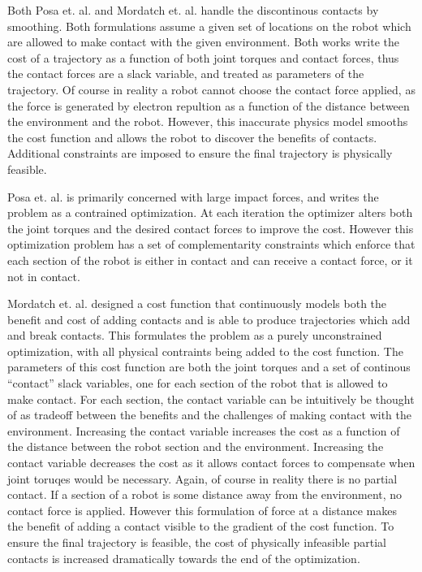 \documentclass[../thesis.tex]{subfiles}
\begin{document}
Both Posa et. al. \cite{Posa2013} and Mordatch et. al. \cite{Mordatch2012}  handle the discontinous contacts by smoothing.
Both formulations assume a given set of locations on the robot which are allowed to make contact with the given environment.
Both works write the cost of a trajectory as a function of both joint torques and contact forces, thus the contact forces are a slack variable, and treated as parameters of the trajectory.
Of course in reality a robot cannot choose the contact force applied, as the force is generated by electron repultion as a function of the distance between the environment and the robot.
However, this inaccurate physics model smooths the cost function and allows the robot to discover the benefits of contacts.
Additional constraints are imposed to ensure the final trajectory is physically feasible.


Posa et. al. is primarily concerned with large impact forces, and writes the problem as a contrained optimization.
At each iteration the optimizer alters both the joint torques and the desired contact forces to improve the cost.
However this optimization problem has a set of complementarity constraints which enforce that each section of the robot is either in contact and can receive a contact force, or it not in contact.

Mordatch et. al. designed a cost function that continuously models both the benefit and cost of adding contacts and is able to produce trajectories which add and break contacts.
This formulates the problem as a purely unconstrained optimization, with all physical contraints being added to the cost function.
The parameters of this cost function are both the joint torques and a set of continous ``contact'' slack variables, one for each section of the robot that is allowed to make contact.
For each section, the contact variable can be intuitively be thought of as tradeoff between the benefits and the challenges of making contact with the environment.
Increasing the contact variable increases the cost as a function of the distance between the robot section and the environment.
Increasing the contact variable decreases the cost as it allows contact forces to compensate when joint toruqes would be necessary.
Again, of course in reality there is no partial contact.
If a section of a robot is some distance away from the environment, no contact force is applied.
However this formulation of force at a distance makes the benefit of adding a contact visible to the gradient of the cost function.
To ensure the final trajectory is feasible, the cost of physically infeasible partial contacts is increased dramatically towards the end of the optimization. 
\end{document}
